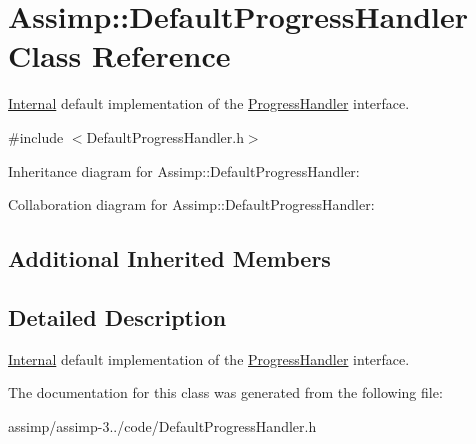 \hypertarget{class_assimp_1_1_default_progress_handler}{\section{Assimp\+:\+:Default\+Progress\+Handler Class Reference}
\label{class_assimp_1_1_default_progress_handler}
}


\hyperlink{struct_internal}{Internal} default implementation of the \hyperlink{class_progress_handler}{Progress\+Handler} interface.  




{\ttfamily \#include $<$Default\+Progress\+Handler.\+h$>$}



Inheritance diagram for Assimp\+:\+:Default\+Progress\+Handler\+:


Collaboration diagram for Assimp\+:\+:Default\+Progress\+Handler\+:
\subsection*{Additional Inherited Members}


\subsection{Detailed Description}
\hyperlink{struct_internal}{Internal} default implementation of the \hyperlink{class_progress_handler}{Progress\+Handler} interface. 

The documentation for this class was generated from the following file\+:\begin{DoxyCompactItemize}
\item 
assimp/assimp-\/3../code/Default\+Progress\+Handler.\+h\end{DoxyCompactItemize}
